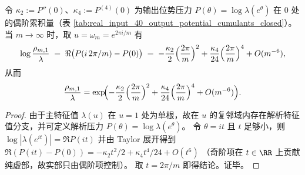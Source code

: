 \begin{corollary}\label{cor:real-input-40-output-dirichlet-cumulant-bridge}
令 \(\kappa_2:=P''(0)\)、\(\kappa_4:=P^{(4)}(0)\) 为输出位势压力 \(P(\theta)=\log\lambda(e^\theta)\) 在 \(0\) 处的偶阶累积量（表 \ref{tab:real_input_40_output_potential_cumulants_closed}）。
当 \(m\to\infty\) 时，取 \(u=\omega_m=e^{2\pi i/m}\) 有
\[
\log\frac{\rho_{m,1}}{\lambda}
\;=\;
\Re\bigl(P(i\,2\pi/m)-P(0)\bigr)
\;=\;
-\frac{\kappa_2}{2}\Bigl(\frac{2\pi}{m}\Bigr)^2
+\frac{\kappa_4}{24}\Bigl(\frac{2\pi}{m}\Bigr)^4
+O(m^{-6}),
\]
从而
\[
\frac{\rho_{m,1}}{\lambda}
=\exp\!\Bigl(
-\frac{\kappa_2}{2}\Bigl(\frac{2\pi}{m}\Bigr)^2
+\frac{\kappa_4}{24}\Bigl(\frac{2\pi}{m}\Bigr)^4
+O(m^{-6})
\Bigr).
\]
\end{corollary}
\begin{proof}
由于主特征值 \(\lambda(u)\) 在 \(u=1\) 处为单根，故在 \(u\) 的复邻域内存在解析特征值分支，并可定义解析压力 \(P(\theta)=\log\lambda(e^\theta)\)。
令 \(\theta=i t\) 且 \(t\) 足够小，则
\(
\log|\lambda(e^{it})|=\Re P(it)
\)
并由 Taylor 展开得到
\(
\Re(P(it)-P(0))=-\kappa_2 t^2/2+\kappa_4 t^4/24+O(t^6)
\)
（奇阶项在 \(t\in\RR\) 上贡献纯虚部，故实部只由偶阶项控制）。
取 \(t=2\pi/m\) 即得结论。证毕。
\end{proof}



